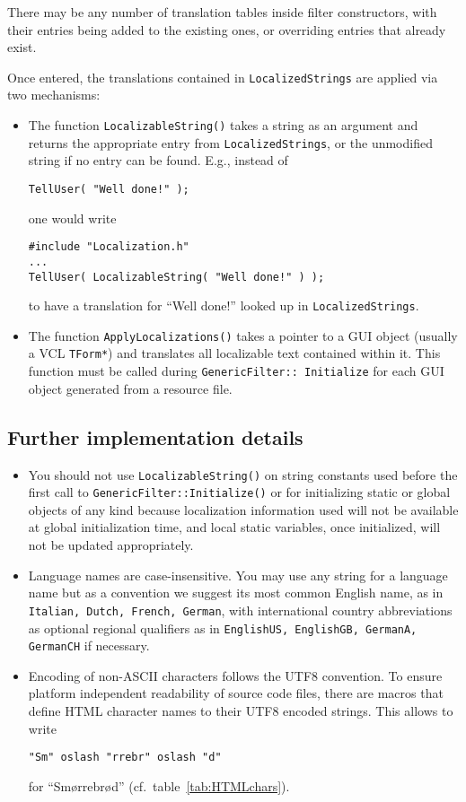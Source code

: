 \documentclass[12pt,a4paper]{article}
\begin{document}
There may be any number of translation tables inside filter constructors, with their
entries being added to the existing ones, or overriding entries that already exist.

Once entered,
the translations contained in \texttt{LocalizedStrings} are applied via two mechanisms:
\begin{itemize}
\item
The function \texttt{LocalizableString()} takes a string as an argument and returns
the appropriate entry from \texttt{LocalizedStrings}, or the unmodified string if no entry
can be found.
E.g., instead of
\begin{verbatim}
TellUser( "Well done!" );
\end{verbatim}
one would write
\begin{verbatim}
#include "Localization.h"
...
TellUser( LocalizableString( "Well done!" ) );
\end{verbatim}

to have a translation for ``Well done!'' looked up in \texttt{LocalizedStrings}.
\item
The function \texttt{ApplyLocalizations()} takes a pointer to a GUI object (usually
a VCL \texttt{TForm*}) and translates all localizable text contained within it.
This function must be called during \texttt{GenericFilter:: Initialize} for each GUI
object generated from a resource file.
\end{itemize}

\subsection{Further implementation details}
\begin{itemize}
\item
You should not use \texttt{LocalizableString()} on string constants used
before the first call to \texttt{GenericFilter::Initialize()} or for
initializing static or global objects of any kind because localization
information used will not be available at global initialization time, and local static variables, once initialized, will not be updated appropriately.
\item
Language names are case-insensitive. You may use any string for a language name but as a convention we suggest
its most common English name, as in
\texttt{Italian, Dutch, French, German},
with international country abbreviations as optional regional
qualifiers as in
\texttt{EnglishUS, EnglishGB, GermanA, GermanCH}
if necessary.
\item
Encoding of non-ASCII characters follows the UTF8
convention. To ensure platform independent readability of source
code files, there are macros that define HTML character names
to their UTF8 encoded strings. This allows to write

\texttt{"Sm" oslash "rrebr" oslash "d"}

for ``Sm\o{}rrebr\o{}d'' (cf.\ table~\ref{tab:HTMLchars}).

\end{itemize}
\end{document}
